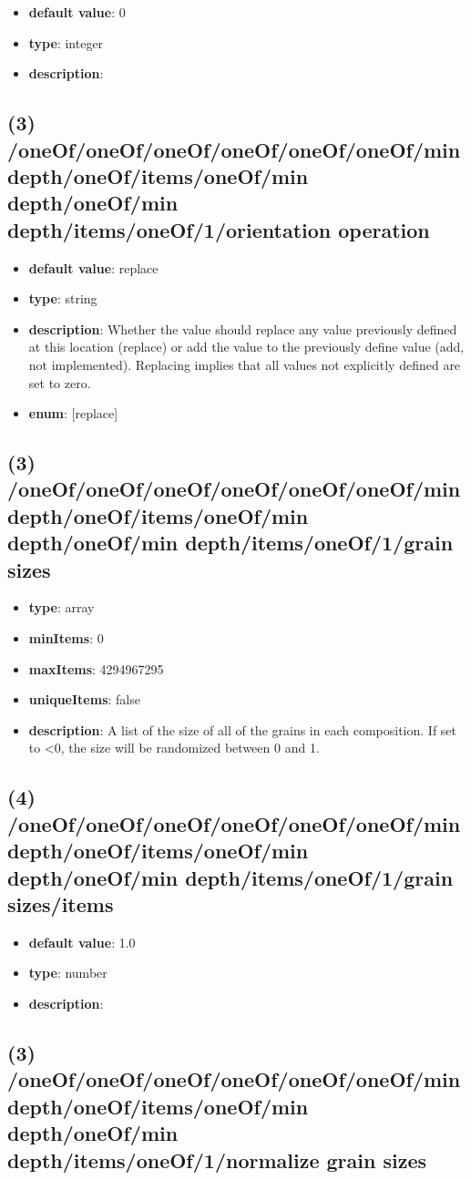 \begin{itemize}[leftmargin=4em]\item {\bf default value}: 0
\item {\bf type}: integer
\item {\bf description}: 
\end{itemize}\subsection{(3) /oneOf/oneOf/oneOf/oneOf/oneOf/oneOf/min depth/oneOf/items/oneOf/min depth/oneOf/min depth/items/oneOf/1/orientation operation}
\begin{itemize}[leftmargin=3em]\item {\bf default value}: replace
\item {\bf type}: string
\item {\bf description}: Whether the value should replace any value previously defined at this location (replace) or add the value to the previously define value (add, not implemented). Replacing implies that all values not explicitly defined are set to zero.
\item {\bf enum}: [replace]\end{itemize}\subsection{(3) /oneOf/oneOf/oneOf/oneOf/oneOf/oneOf/min depth/oneOf/items/oneOf/min depth/oneOf/min depth/items/oneOf/1/grain sizes}
\begin{itemize}[leftmargin=3em]\item {\bf type}: array
\item {\bf minItems}: 0
\item {\bf maxItems}: 4294967295
\item {\bf uniqueItems}: false
\item {\bf description}: A list of the size of all of the grains in each composition. If set to <0, the size will be randomized between 0 and 1.
\end{itemize}\subsection{(4) /oneOf/oneOf/oneOf/oneOf/oneOf/oneOf/min depth/oneOf/items/oneOf/min depth/oneOf/min depth/items/oneOf/1/grain sizes/items}
\begin{itemize}[leftmargin=4em]\item {\bf default value}: 1.0
\item {\bf type}: number
\item {\bf description}: 
\end{itemize}\subsection{(3) /oneOf/oneOf/oneOf/oneOf/oneOf/oneOf/min depth/oneOf/items/oneOf/min depth/oneOf/min depth/items/oneOf/1/normalize grain sizes}
